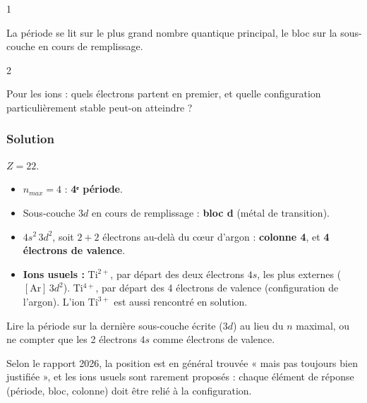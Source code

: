 \documentclass[11pt,a4paper]{article}
\providecommand{\tightlist}{\setlength{\itemsep}{0pt}\setlength{\parskip}{0pt}}
\begin{document}
\begin{indication}{1}

La période se lit sur le plus grand nombre quantique principal, le bloc sur la sous-couche en cours de remplissage.

\end{indication}

\begin{indication}{2}

Pour les ions : quels électrons partent en premier, et quelle configuration particulièrement stable peut-on atteindre ?

\end{indication}

\hypertarget{solution-23}{%
\subsubsection{Solution}\label{solution-23}}

\(Z = 22\).

\begin{itemize}
\tightlist
\item
  \(n_{max} = 4\) : \textbf{4ᵉ période}.
\item
  Sous-couche \(3d\) en cours de remplissage : \textbf{bloc d} (métal de transition).
\item
  \(4s^2\,3d^2\), soit \(2 + 2\) électrons au-delà du cœur d'argon : \textbf{colonne 4}, et \textbf{4 électrons de valence}.
\item
  \textbf{Ions usuels :} \(\mathrm{Ti^{2+}}\), par départ des deux électrons \(4s\), les plus externes (\([\mathrm{Ar}]\,3d^2\)). \(\mathrm{Ti^{4+}}\), par départ des 4 électrons de valence (configuration de l'argon). L'ion \(\mathrm{Ti^{3+}}\) est aussi rencontré en solution.
\end{itemize}

\begin{piege}

Lire la période sur la dernière sous-couche écrite (\(3d\)) au lieu du \(n\) maximal, ou ne compter que les 2 électrons \(4s\) comme électrons de valence.

\end{piege}

\begin{jury}

Selon le rapport 2026, la position est en général trouvée « mais pas toujours bien justifiée », et les ions usuels sont rarement proposés : chaque élément de réponse (période, bloc, colonne) doit être relié à la configuration.

\end{jury}
\end{document}
